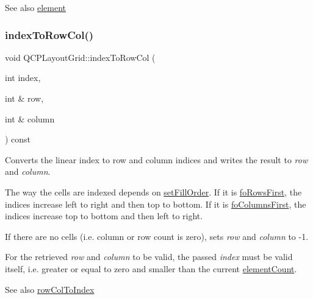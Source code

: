 \begin{DoxySeeAlso}{See also}
\hyperlink{class_q_c_p_layout_grid_a602b426609b4411cf6a93c3ddf3a381a}{element} 
\end{DoxySeeAlso}
\mbox{\label{class_q_c_p_layout_grid_a577223db920e2acb34bc1091080c76d1}} 
\subsubsection{\texorpdfstring{index\+To\+Row\+Col()}{indexToRowCol()}}
{\footnotesize\ttfamily void Q\+C\+P\+Layout\+Grid\+::index\+To\+Row\+Col (\begin{DoxyParamCaption}\item[{int}]{index,  }\item[{int \&}]{row,  }\item[{int \&}]{column }\end{DoxyParamCaption}) const}

Converts the linear index to row and column indices and writes the result to {\itshape row} and {\itshape column}.

The way the cells are indexed depends on \hyperlink{class_q_c_p_layout_grid_affc2f3cfd22f28698c5b29b960d2a391}{set\+Fill\+Order}. If it is \hyperlink{class_q_c_p_layout_grid_a7d49ee08773de6b2fd246edfed353ccaa727502c945b524b47b6a727429ecc198}{fo\+Rows\+First}, the indices increase left to right and then top to bottom. If it is \hyperlink{class_q_c_p_layout_grid_a7d49ee08773de6b2fd246edfed353ccaab17e416e3f51ccb897694a3aec6b86b8}{fo\+Columns\+First}, the indices increase top to bottom and then left to right.

If there are no cells (i.\+e. column or row count is zero), sets {\itshape row} and {\itshape column} to -\/1.

For the retrieved {\itshape row} and {\itshape column} to be valid, the passed {\itshape index} must be valid itself, i.\+e. greater or equal to zero and smaller than the current \hyperlink{class_q_c_p_layout_grid_a9a8942aface780a02445ebcf14c48513}{element\+Count}.

\begin{DoxySeeAlso}{See also}
\hyperlink{class_q_c_p_layout_grid_a682ba76f130810ffd294032a1bfbcfcb}{row\+Col\+To\+Index} 
\end{DoxySeeAlso}
\mbox{\label{class_q_c_p_layout_grid_a1e880a321dbe8b43b471ccd764433dc4}} 
